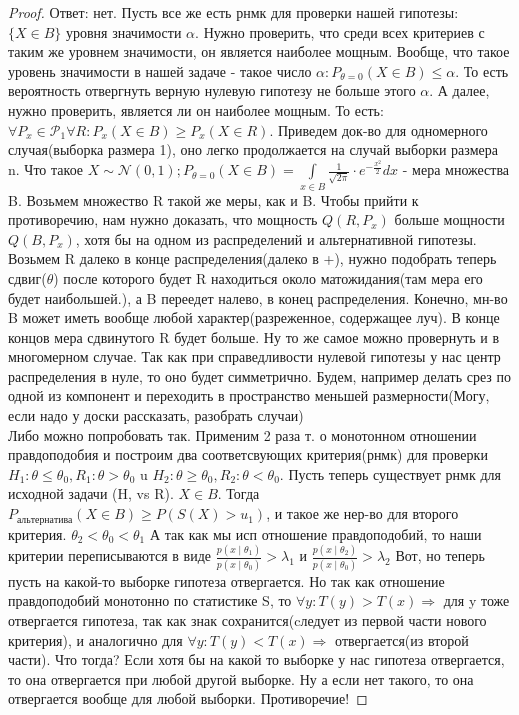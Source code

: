 \documentclass{article}
\theoremstyle{plain}
\theoremstyle{definition}
\begin{document}
\begin{proof}
	Ответ: нет. Пусть все же есть рнмк для проверки нашей гипотезы: $\lbrace X \in B  \rbrace $ уровня значимости $\alpha$. Нужно проверить, что среди всех критериев с таким же уровнем значимости, он является наиболее мощным. Вообще, что такое уровень значимости в нашей задаче - такое число $\alpha: P_{\theta = 0}(X \in B) \leq \alpha$. То есть вероятность отвергнуть верную нулевую гипотезу не больше этого $\alpha$.
	А далее, нужно проверить, является ли он наиболее мощным. То есть: $\forall P_x \in \mathcal{P}_1 \forall R: P_x(X \in B) \geq P_x(X \in R)$. Приведем док-во для одномерного случая(выборка размера 1), оно легко продолжается на случай выборки размера n.
	Что такое $X \sim \mathcal{N}(0,1); P_{\theta = 0}(X \in B) = \int\limits_{x \in B}\frac{1}{\sqrt{2\pi}} \cdot e^{-\frac{x^2}{2}}dx$ -  мера множества B. Возьмем множество R такой же меры, как и B. Чтобы прийти к противоречию, нам нужно доказать, что мощность $Q(R, P_x)$ больше мощности $Q(B, P_x)$, хотя бы на одном из распределений и альтернативной гипотезы. Возьмем R далеко в конце распределения(далеко в +), нужно подобрать теперь сдвиг($\theta$) после которого будет R находиться около матожидания(там мера его будет наибольшей.), а B переедет налево, в конец распределения. Конечно, мн-во B может иметь вообще любой характер(разреженное, содержащее луч). В конце концов мера сдвинутого R будет больше. Ну то же самое можно провернуть и в многомерном случае. Так как при справедливости нулевой гипотезы у нас центр распределения в нуле, то оно будет симметрично. Будем, например делать срез по одной из компонент и переходить в пространство меньшей размерности(Могу, если надо у доски рассказать, разобрать случаи) \\
	
	
	Либо можно попробовать  так. Применим 2 раза т. о монотонном отношении правдоподобия и построим два соответсвующих критерия(рнмк) для проверки $H_1: \theta \leq \theta_0, R_1: \theta > \theta_0$ u $H_2: \theta \geq \theta_0, R_2: \theta < \theta_0$. Пусть теперь существует рнмк для исходной задачи (H, vs R). ${X \in B}$. Тогда $P_{альтернатива}(X \in B) \geq P(S(X) > u_1)$, и такое же нер-во для второго критерия. $\theta_2 < \theta_0 < \theta_1$ А так как мы исп отношение правдоподобий, то наши критерии переписываются в виде  $\frac{p(x \mid \theta_1)}{p(x \mid \theta_0)} > \lambda_1$ и  $\frac{p(x \mid \theta_2)}{p(x \mid \theta_0)} > \lambda_2$
		Вот, но теперь пусть на какой-то выборке гипотеза отвергается. Но так как отношение правдоподобий монотонно по статистике S, то $\forall y: T(y) > T(x) \Rightarrow $ для y тоже отвергается гипотеза, так как знак сохранится(cледует из первой части нового критерия), и аналогично для 
		$\forall y: T(y) < T(x) \Rightarrow $ отвергается(из второй части). Что тогда? Если хотя бы на какой то выборке у нас гипотеза отвергается, то она отвергается при любой другой выборке. Ну а если нет такого, то она отвергается вообще для любой выборки. Противоречие!
		
		\end{proof}
\end{document}
